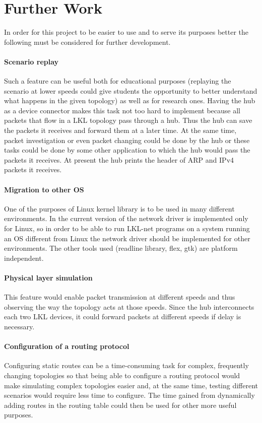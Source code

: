 \chapter{Further Work}
\label{chapter:further}
In order for this project to be easier to use and to serve its purposes better the following must be considered for further development.

\subsubsection{Scenario replay}
\label{sec:scenario-replay}
Such a feature can be useful both for educational purposes (replaying the scenario at lower speeds could give students 
the opportunity to better understand what happens in the given topology) as well as for research ones. Having the hub as a 
device connector makes this task not too hard to implement because all packets that flow in a LKL topology pass through a hub. 
Thus the hub can save the packets it receives and forward them at a later time. At the same time, packet investigation or even
packet changing could be done by the hub or these tasks could be done by some other application to which the hub would pass the 
packets it receives. At present the hub prints the header of ARP and IPv4 packets it receives.

\subsubsection{Migration to other OS}
\label{sec:migration-os}
One of the purposes of Linux kernel library is to be used in many different environments. In the current version of \project the 
network driver is implemented only for Linux, so in order to be able to run LKL-net programs on a system running an 
OS different from Linux the network driver should be implemented for other environments.
The other tools used (readline library, flex, gtk) are platform independent.%

\subsubsection{Physical layer simulation}
\label{sec:physica-sim}
This feature would enable packet transmission at different speeds and thus observing the way the 
topology acts at those speeds. Since the hub interconnects each two LKL devices, it could forward 
packets at different speeds if delay is necessary. 

\subsubsection{Configuration of a routing protocol}
\label{sec:routing-prot}
Configuring static routes can be a time-consuming task for complex, frequently changing topologies so that 
being able to configure a routing protocol would make simulating complex topologies easier and, at the same time, 
testing different scenarios would require less time to configure. The time gained from dynamically adding routes in 
the routing table could then be used for other more useful purposes.

